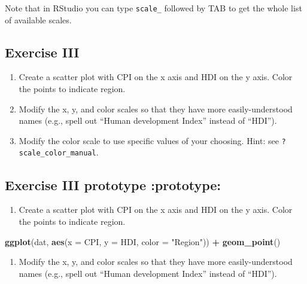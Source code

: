 \documentclass[]{book}
\newenvironment{Shaded}{\begin{snugshade}}{\end{snugshade}}
\newcommand{\KeywordTok}[1]{\textcolor[rgb]{0.13,0.29,0.53}{\textbf{#1}}}
\newcommand{\DataTypeTok}[1]{\textcolor[rgb]{0.13,0.29,0.53}{#1}}
\newcommand{\StringTok}[1]{\textcolor[rgb]{0.31,0.60,0.02}{#1}}
\newcommand{\OperatorTok}[1]{\textcolor[rgb]{0.81,0.36,0.00}{\textbf{#1}}}
\newcommand{\NormalTok}[1]{#1}
\providecommand{\tightlist}{%
  \setlength{\itemsep}{0pt}\setlength{\parskip}{0pt}}
\begin{document}
Note that in RStudio you can type \texttt{scale\_} followed by TAB to
get the whole list of available scales.

\subsection{Exercise III}\label{exercise-iii}

\begin{enumerate}
\def\labelenumi{\arabic{enumi}.}
\tightlist
\item
  Create a scatter plot with CPI on the x axis and HDI on the y axis.
  Color the points to indicate region.
\item
  Modify the x, y, and color scales so that they have more
  easily-understood names (e.g., spell out ``Human development Index''
  instead of ``HDI'').
\item
  Modify the color scale to use specific values of your choosing. Hint:
  see \texttt{?scale\_color\_manual}.
\end{enumerate}

\subsection{Exercise III prototype
:prototype:}\label{exercise-iii-prototype-prototype}

\begin{enumerate}
\def\labelenumi{\arabic{enumi}.}
\tightlist
\item
  Create a scatter plot with CPI on the x axis and HDI on the y axis.
  Color the points to indicate region.
\end{enumerate}

\begin{Shaded}
\begin{Highlighting}[]
\KeywordTok{ggplot}\NormalTok{(dat, }\KeywordTok{aes}\NormalTok{(}\DataTypeTok{x =}\NormalTok{ CPI, }\DataTypeTok{y =}\NormalTok{ HDI, }\DataTypeTok{color =} \StringTok{"Region"}\NormalTok{)) }\OperatorTok{+}
\StringTok{  }\KeywordTok{geom_point}\NormalTok{()}
\end{Highlighting}
\end{Shaded}

\begin{enumerate}
\def\labelenumi{\arabic{enumi}.}
\setcounter{enumi}{1}
\tightlist
\item
  Modify the x, y, and color scales so that they have more
  easily-understood names (e.g., spell out ``Human development Index''
  instead of ``HDI'').
\end{enumerate}
\end{document}

